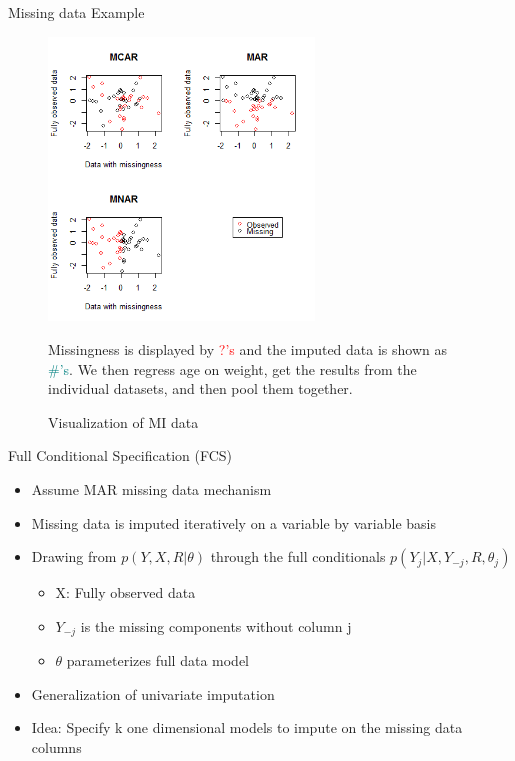 \begin{frame}{Missing data Example}

 \begin{figure}[h!]
  \centering
    \includegraphics[width=0.63\textwidth]{md_mechanism}
  \caption{Visualization of MI data}
\label{fig:miviz}
\medskip
\small
Missingness is displayed by \textcolor{red}{?'s} and the imputed data is shown  as \textcolor{teal}{\#'s}.
We then regress age on weight, get the results from the individual datasets, and then pool them together.
\end{figure}
 
\end{frame}

\begin{frame}{Full Conditional Specification (FCS)}
 \begin{itemize}
  \item Assume MAR missing data mechanism %
  \item Missing data is imputed iteratively on a variable by variable basis
  \item Drawing from $p(Y,X,R|\theta)$ through the full conditionals $p(Y_j|X,Y_{-j},R,\theta_j)$
  \begin{itemize}
   \item X: Fully observed data
   \item $Y_{-j}$ is the missing components without column j
   \item $\theta$ parameterizes full data model
  \end{itemize}

  \item Generalization of univariate imputation
  \item Idea: Specify k one dimensional models to impute on the missing data columns
 \end{itemize}

\end{frame}

